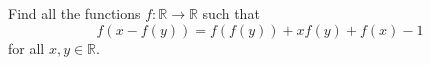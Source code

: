 Find all the functions $f: \mathbb{R} \to\mathbb{R}$ such that\[f(x-f(y))=f(f(y))+xf(y)+f(x)-1\]for all $x,y \in \mathbb{R} $.